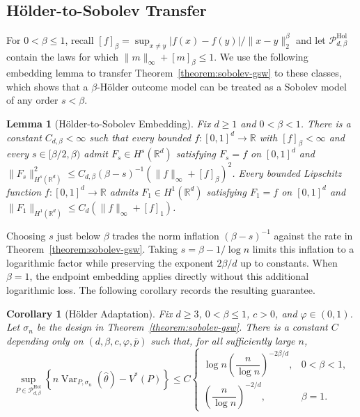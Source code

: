 \documentclass[letterpaper,12pt]{article}
\newtheorem{lem}[thm]{Lemma}
\newtheorem{cor}[thm]{Corollary}
\theoremstyle{definition}
\numberwithin{equation}{section}
\newcommand{\mr}{\mathbb{R}}
\newcommand{\mc}{\mathcal}
\newcommand{\norm}[1]{\lVert#1\rVert}
\DeclareMathOperator{\var}{Var}
\begin{document}
\subsection{H\"older-to-Sobolev Transfer}\label{appendix:holder-sobolev}

For $0<\beta\leq1$, recall $[f]_\beta=\sup_{x\neq y}|f(x)-f(y)|/\norm{x-y}_2^\beta$ and let $\mc P_{d,\beta}^{\mathrm{Hol}}$ contain the laws for which $\norm{m}_\infty+[m]_\beta\leq1$.
We use the following embedding lemma to transfer Theorem~\ref{theorem:sobolev-gsw} to these classes, which shows that a $\beta$-H\"older outcome model can be treated as a Sobolev model of any order $s<\beta$.

\begin{lem}[H\"older-to-Sobolev Embedding]\label{lemma:holder-sobolev}
Fix $d\geq1$ and $0<\beta<1$.
There is a constant $C_{d,\beta}<\infty$ such that every bounded $f:[0,1]^d\to\mathbb R$ with $[f]_\beta<\infty$ and every $s\in[\beta/2,\beta)$ admit $F_s\in H^s(\mr^d)$ satisfying $F_s=f$ on $[0,1]^d$ and $\norm{F_s}_{H^s(\mr^d)}^2\leq C_{d,\beta}(\beta-s)^{-1}(\norm{f}_\infty+[f]_\beta)^2$.
Every bounded Lipschitz function $f:[0,1]^d\to\mathbb R$ admits $F_1\in H^1(\mr^d)$ satisfying $F_1=f$ on $[0,1]^d$ and $\norm{F_1}_{H^1(\mr^d)}\leq C_d(\norm{f}_\infty+[f]_1)$.
\end{lem}

Choosing $s$ just below $\beta$ trades the norm inflation $(\beta-s)^{-1}$ against the rate in Theorem~\ref{theorem:sobolev-gsw}.
Taking $s=\beta-1/\log n$ limits this inflation to a logarithmic factor while preserving the exponent $2\beta/d$ up to constants.
When $\beta=1$, the endpoint embedding applies directly without this additional logarithmic loss.
The following corollary records the resulting guarantee.

\begin{cor}[H\"older Adaptation]\label{corollary:holder-gsw}
Fix $d\geq3$, $0<\beta\leq1$, $c>0$, and $\varphi\in(0,1)$.
Let $\sigma_n$ be the design in Theorem~\ref{theorem:sobolev-gsw}.
There is a constant $C$ depending only on $(d,\beta,c,\varphi,\overline p)$ such that, for all sufficiently large $n$,
\begin{equation}\label{equation:holder-gsw}
\sup_{P\in\mc P_{d,\beta}^{\mathrm{Hol}}} \left\{ n\var_{P,\sigma_n}(\widehat\theta)-V^*(P) \right\} \leq C\begin{cases}
\log n\left(\dfrac n{\log n}\right)^{-2\beta/d},&0<\beta<1,\\[6pt]
\left(\dfrac n{\log n}\right)^{-2/d},&\beta=1.
\end{cases}
\end{equation}
\end{cor}
\end{document}
